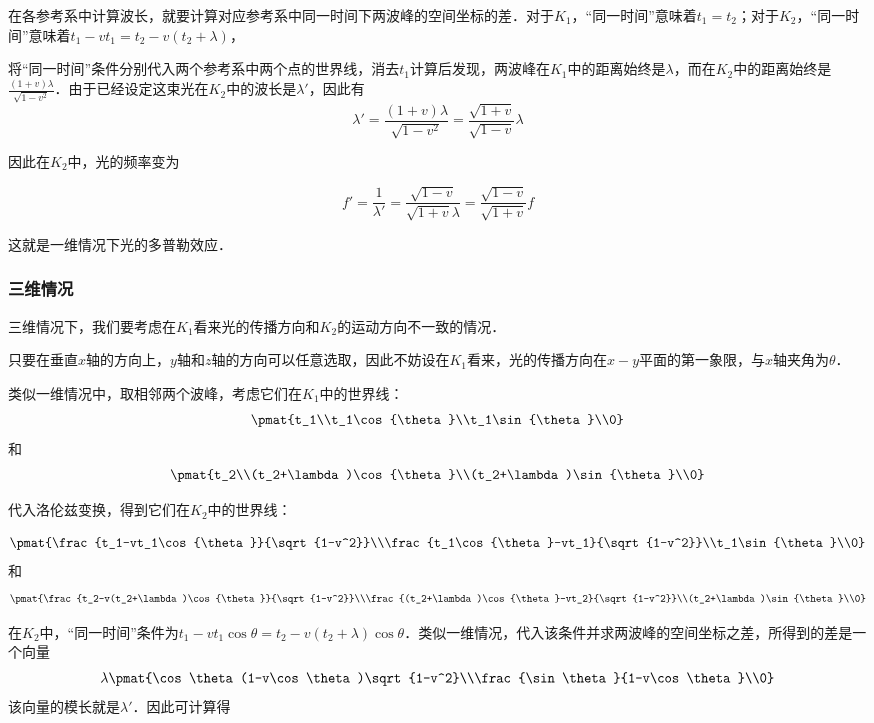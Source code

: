 在各参考系中计算波长，就要计算对应参考系中同一时间下两波峰的空间坐标的差．对于$K_1$，“同一时间”意味着$t_1=t_2$；对于$K_2$，“同一时间”意味着$t_1-vt_1=t_2-v(t_2+\lambda)$，

将“同一时间”条件分别代入两个参考系中两个点的世界线，消去$t_1$计算后发现，两波峰在$K_1$中的距离始终是$\lambda$，而在$K_2$中的距离始终是$\frac{(1+v)\lambda}{\sqrt{1-v^2}}$．由于已经设定这束光在$K_2$中的波长是$\lambda'$，因此有
\begin{equation}
\lambda'=\frac{(1+v)\lambda}{\sqrt{1-v^2}}=\frac{\sqrt{1+v}}{\sqrt{1-v}}\lambda
\end{equation}

因此在$K_2$中，光的频率变为

\begin{equation}
f'=\frac{1}{\lambda'}=\frac{\sqrt{1-v}}{\sqrt{1+v}\lambda}=\frac{\sqrt{1-v}}{\sqrt{1+v}}f
\end{equation}

这就是一维情况下光的多普勒效应．

\subsubsection{三维情况}

三维情况下，我们要考虑在$K_1$看来光的传播方向和$K_2$的运动方向不一致的情况．

只要在垂直$x$轴的方向上，$y$轴和$z$轴的方向可以任意选取，因此不妨设在$K_1$看来，光的传播方向在$x-y$平面的第一象限，与$x$轴夹角为$\theta$．

类似一维情况中，取相邻两个波峰，考虑它们在$K_1$中的世界线：
\begin{equation}
\pmat{t_1\\t_1\cos{\theta}\\t_1\sin{\theta}\\0}
\end{equation}
和
\begin{equation}
\pmat{t_2\\(t_2+\lambda)\cos{\theta}\\(t_2+\lambda)\sin{\theta}\\0}
\end{equation}

代入洛伦兹变换，得到它们在$K_2$中的世界线：

\begin{equation}
\pmat{\frac{t_1-vt_1\cos{\theta}}{\sqrt{1-v^2}}\\\frac{t_1\cos{\theta}-vt_1}{\sqrt{1-v^2}}\\t_1\sin{\theta}\\0}
\end{equation}
和
\begin{equation}
\pmat{\frac{t_2-v(t_2+\lambda)\cos{\theta}}{\sqrt{1-v^2}}\\\frac{(t_2+\lambda)\cos{\theta}-vt_2}{\sqrt{1-v^2}}\\(t_2+\lambda)\sin{\theta}\\0}
\end{equation}

在$K_2$中，“同一时间”条件为$t_1-vt_1\cos{\theta}=t_2-v(t_2+\lambda)\cos{\theta}$．类似一维情况，代入该条件并求两波峰的空间坐标之差，所得到的差是一个向量
\begin{equation}
\lambda\pmat{\cos\theta(1-v\cos\theta)\sqrt{1-v^2}\\\frac{\sin\theta}{1-v\cos\theta}\\0}
\end{equation}
该向量的模长就是$\lambda'$．因此可计算得
